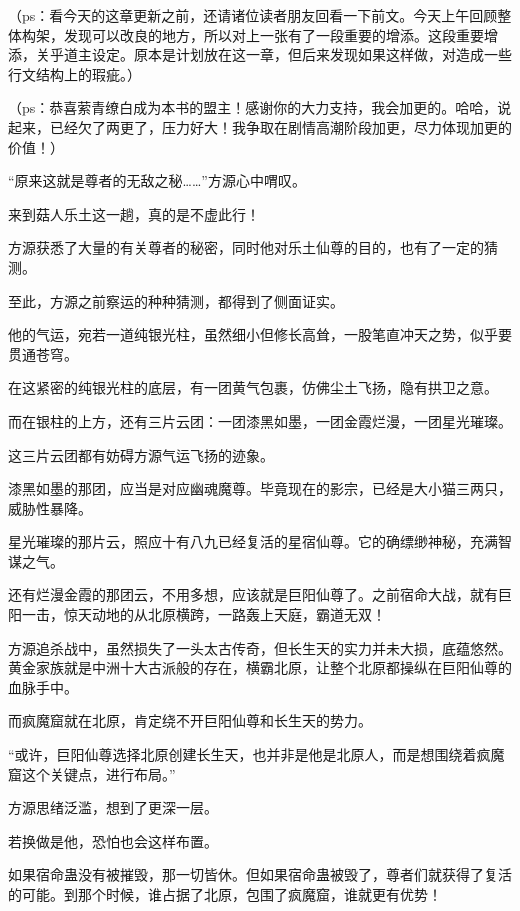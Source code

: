 
\begin{this_body}

（ps：看今天的这章更新之前，还请诸位读者朋友回看一下前文。今天上午回顾整体构架，发现可以改良的地方，所以对上一张有了一段重要的增添。这段重要增添，关乎道主设定。原本是计划放在这一章，但后来发现如果这样做，对造成一些行文结构上的瑕疵。）

（ps：恭喜萦青缭白成为本书的盟主！感谢你的大力支持，我会加更的。哈哈，说起来，已经欠了两更了，压力好大！我争取在剧情高潮阶段加更，尽力体现加更的价值！）

“原来这就是尊者的无敌之秘……”方源心中喟叹。

来到菇人乐土这一趟，真的是不虚此行！

方源获悉了大量的有关尊者的秘密，同时他对乐土仙尊的目的，也有了一定的猜测。

至此，方源之前察运的种种猜测，都得到了侧面证实。

他的气运，宛若一道纯银光柱，虽然细小但修长高耸，一股笔直冲天之势，似乎要贯通苍穹。

在这紧密的纯银光柱的底层，有一团黄气包裹，仿佛尘土飞扬，隐有拱卫之意。

而在银柱的上方，还有三片云团：一团漆黑如墨，一团金霞烂漫，一团星光璀璨。

这三片云团都有妨碍方源气运飞扬的迹象。

漆黑如墨的那团，应当是对应幽魂魔尊。毕竟现在的影宗，已经是大小猫三两只，威胁性暴降。

星光璀璨的那片云，照应十有八九已经复活的星宿仙尊。它的确缥缈神秘，充满智谋之气。

还有烂漫金霞的那团云，不用多想，应该就是巨阳仙尊了。之前宿命大战，就有巨阳一击，惊天动地的从北原横跨，一路轰上天庭，霸道无双！

方源追杀战中，虽然损失了一头太古传奇，但长生天的实力并未大损，底蕴悠然。黄金家族就是中洲十大古派般的存在，横霸北原，让整个北原都操纵在巨阳仙尊的血脉手中。

而疯魔窟就在北原，肯定绕不开巨阳仙尊和长生天的势力。

“或许，巨阳仙尊选择北原创建长生天，也并非是他是北原人，而是想围绕着疯魔窟这个关键点，进行布局。”

方源思绪泛滥，想到了更深一层。

若换做是他，恐怕也会这样布置。

如果宿命蛊没有被摧毁，那一切皆休。但如果宿命蛊被毁了，尊者们就获得了复活的可能。到那个时候，谁占据了北原，包围了疯魔窟，谁就更有优势！


\end{this_body}
